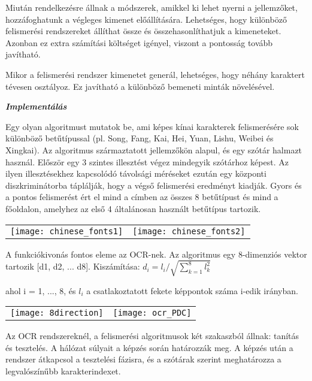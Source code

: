Miután rendelkezésre állnak a módszerek, amikkel ki lehet nyerni a jellemzőket, hozzáfoghatunk a végleges kimenet előállítására. Lehetséges, hogy különböző felismerési rendszereket állíthat össze és összehasonlíthatjuk a kimeneteket. Azonban ez extra számítási költséget igényel, viszont a pontosság tovább javítható.

Mikor a felismerési rendszer kimenetet generál, lehetséges, hogy néhány karaktert tévesen osztályoz. Ez javítható a különböző bemeneti minták növelésével.

\begin{flushleft}
\textit{\textbf{{\large Implementálás\\}}}
\end{flushleft}

Egy olyan algoritmust mutatok be, ami képes kínai karakterek felismerésére sok különböző betűtípussal (pl. Song, Fang, Kai, Hei, Yuan, Lishu, Weibei és Xingkai). Az algoritmus származtatott jellemzőkön alapul, és egy szótár halmazt használ. Először egy 3 szintes illesztést végez mindegyik szótárhoz képest. Az ilyen illesztésekhez kapcsolódó távolsági méréseket ezután egy központi diszkriminátorba táplálják, hogy a végső felismerési eredményt kiadják. Gyors és a pontos felismerést ért el mind a címben az összes 8 betűtípust és mind a főoldalon, amelyhez az első 4 általánosan használt betűtípus tartozik.\\

\begin{tabular}{ c c }
\texttt{[image: chinese\_fonts1]} & \texttt{[image: chinese\_fonts2]}
\end{tabular}

A funkciókivonás fontos eleme az OCR-nek. Az algoritmus egy 8-dimenziós vektor tartozik [d1, d2, ... d8]. Kiszámítása: \( d_i = l_i / \sqrt{\sum_{k=1}^8 l_k^2} \)

ahol i = 1, ..., 8, és $l_i$ a csatlakoztatott fekete képpontok száma i-edik irányban.

\begin{center}
\begin{tabular}{ c c }
\texttt{[image: 8direction]} & \texttt{[image: ocr\_PDC]}
\end{tabular}
\end{center}

Az OCR rendszereknél, a felismerési algoritmusok két szakaszból állnak: tanítás és tesztelés. A hálózat súlyait a képzés során határozzák meg. A képzés után a rendszer átkapcsol a tesztelési fázisra, és a szótárak szerint meghatározza a legvalószínűbb karakterindexet.\\


